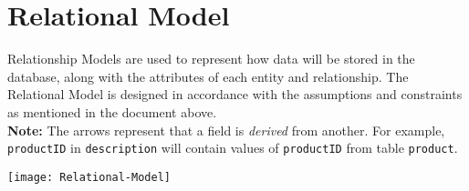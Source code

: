 \section*{\Huge Relational Model}
\vspace*{10pt}
Relationship Models are used to represent how data will be stored in the database, along with the attributes of each entity and relationship.
The Relational Model is designed in accordance with the assumptions and constraints as mentioned in the document above. \\
\newline
\textbf{Note:} The arrows represent that a field is \textit{derived} from another.
For example, \texttt{productID} in \texttt{description} will contain values of \texttt{productID} from table \texttt{product}.
\pagebreak
\vspace*{35pt}
\begin{center}
    \hspace*{-40pt}
    \texttt{[image: Relational-Model]}
\end{center}

\pagebreak